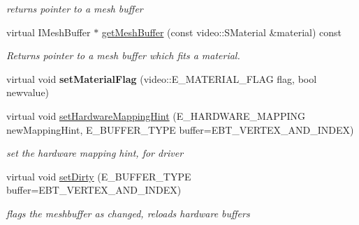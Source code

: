\begin{DoxyCompactItemize}
\begin{DoxyCompactList}\small\item\em returns pointer to a mesh buffer \end{DoxyCompactList}\item 
virtual I\-Mesh\-Buffer $\ast$ \hyperlink{classirr_1_1scene_1_1_c_q3_level_mesh_aa2154ba552ab970008d4f1b449e0ac9e}{get\-Mesh\-Buffer} (const video\-::\-S\-Material \&material) const 
\begin{DoxyCompactList}\small\item\em Returns pointer to a mesh buffer which fits a material. \end{DoxyCompactList}\item 
\hypertarget{classirr_1_1scene_1_1_c_q3_level_mesh_a4929fb514f306780de3267fe58bb7196}{virtual void {\bfseries set\-Material\-Flag} (video\-::\-E\-\_\-\-M\-A\-T\-E\-R\-I\-A\-L\-\_\-\-F\-L\-A\-G flag, bool newvalue)}\label{classirr_1_1scene_1_1_c_q3_level_mesh_a4929fb514f306780de3267fe58bb7196}

\item 
\hypertarget{classirr_1_1scene_1_1_c_q3_level_mesh_a1cc7539e3574e81e044b328bbf3ef251}{virtual void \hyperlink{classirr_1_1scene_1_1_c_q3_level_mesh_a1cc7539e3574e81e044b328bbf3ef251}{set\-Hardware\-Mapping\-Hint} (E\-\_\-\-H\-A\-R\-D\-W\-A\-R\-E\-\_\-\-M\-A\-P\-P\-I\-N\-G new\-Mapping\-Hint, E\-\_\-\-B\-U\-F\-F\-E\-R\-\_\-\-T\-Y\-P\-E buffer=E\-B\-T\-\_\-\-V\-E\-R\-T\-E\-X\-\_\-\-A\-N\-D\-\_\-\-I\-N\-D\-E\-X)}\label{classirr_1_1scene_1_1_c_q3_level_mesh_a1cc7539e3574e81e044b328bbf3ef251}

\begin{DoxyCompactList}\small\item\em set the hardware mapping hint, for driver \end{DoxyCompactList}\item 
\hypertarget{classirr_1_1scene_1_1_c_q3_level_mesh_ab99f3d21532b59ec5dec984b5cad54d3}{virtual void \hyperlink{classirr_1_1scene_1_1_c_q3_level_mesh_ab99f3d21532b59ec5dec984b5cad54d3}{set\-Dirty} (E\-\_\-\-B\-U\-F\-F\-E\-R\-\_\-\-T\-Y\-P\-E buffer=E\-B\-T\-\_\-\-V\-E\-R\-T\-E\-X\-\_\-\-A\-N\-D\-\_\-\-I\-N\-D\-E\-X)}\label{classirr_1_1scene_1_1_c_q3_level_mesh_ab99f3d21532b59ec5dec984b5cad54d3}

\begin{DoxyCompactList}\small\item\em flags the meshbuffer as changed, reloads hardware buffers \end{DoxyCompactList}\end{DoxyCompactItemize}


